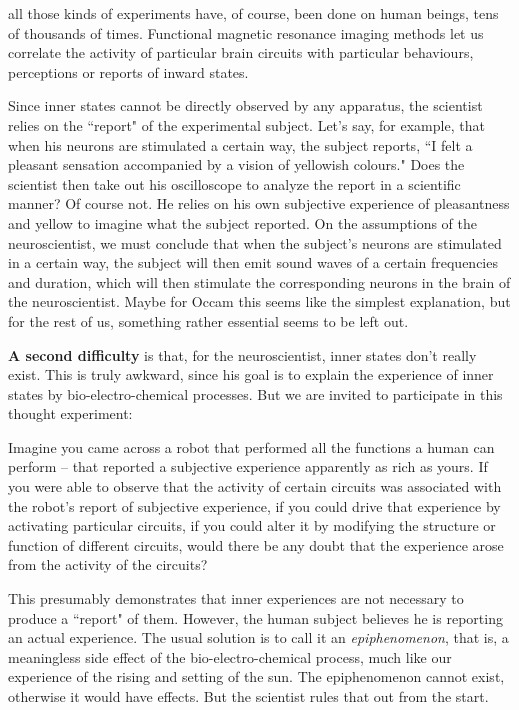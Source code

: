 \begin{quotex}
all those kinds of experiments have, of course, been done on human beings, tens of thousands of times. Functional magnetic resonance imaging methods let us correlate the activity of particular brain circuits with particular behaviours, perceptions or reports of inward states.

\end{quotex}
Since inner states cannot be directly observed by any apparatus, the scientist relies on the ``report" of the experimental subject. Let's say, for example, that when his neurons are stimulated a certain way, the subject reports, ``I felt a pleasant sensation accompanied by a vision of yellowish colours." Does the scientist then take out his oscilloscope to analyze the report in a scientific manner? Of course not. He relies on his own subjective experience of pleasantness and yellow to imagine what the subject reported. On the assumptions of the neuroscientist, we must conclude that when the subject's neurons are stimulated in a certain way, the subject will then emit sound waves of a certain frequencies and duration, which will then stimulate the corresponding neurons in the brain of the neuroscientist. Maybe for Occam this seems like the simplest explanation, but for the rest of us, something rather essential seems to be left out.

\textbf{A second difficulty} is that, for the neuroscientist, inner states don't really exist. This is truly awkward, since his goal is to explain the experience of inner states by bio-electro-chemical processes. But we are invited to participate in this thought experiment:

\begin{quotex}
Imagine you came across a robot that performed all the functions a human can perform – that reported a subjective experience apparently as rich as yours. If you were able to observe that the activity of certain circuits was associated with the robot's report of subjective experience, if you could drive that experience by activating particular circuits, if you could alter it by modifying the structure or function of different circuits, would there be any doubt that the experience arose from the activity of the circuits?

\end{quotex}
This presumably demonstrates that inner experiences are not necessary to produce a ``report" of them. However, the human subject believes he is reporting an actual experience. The usual solution is to call it an \emph{epiphenomenon}, that is, a meaningless side effect of the bio-electro-chemical process, much like our experience of the rising and setting of the sun. The epiphenomenon cannot exist, otherwise it would have effects. But the scientist rules that out from the start.

